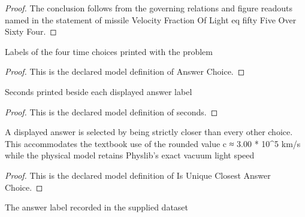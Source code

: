 \begin{proof}
  The conclusion follows from the governing relations and figure readouts named in the statement of missile Velocity Fraction Of Light eq fifty Five Over Sixty Four.
\end{proof}
\begin{definition}
  \label{def:physics:phyx-mini-0512:phyxminiproblems-problemphyxmini0512-answerchoice}
  Labels of the four time choices printed with the problem
\end{definition}
\begin{proof}
  This is the declared model definition of Answer Choice.
\end{proof}
\begin{definition}[seconds]
  \label{def:physics:phyx-mini-0512:phyxminiproblems-problemphyxmini0512-answerchoice-seconds}
  Seconds printed beside each displayed answer label
\end{definition}
\begin{proof}
  This is the declared model definition of seconds.
\end{proof}
\begin{definition}
  \label{def:physics:phyx-mini-0512:phyxminiproblems-problemphyxmini0512-isuniqueclosestanswerchoice}
  A displayed answer is selected by being strictly closer than every other choice. This accommodates the textbook use of the rounded value c ≈ 3.00 * 10\textasciicircum{}5 km/s while the physical model retains Physlib's exact vacuum light speed
\end{definition}
\begin{proof}
  This is the declared model definition of Is Unique Closest Answer Choice.
\end{proof}
\begin{definition}
  \label{def:physics:phyx-mini-0512:phyxminiproblems-problemphyxmini0512-recordedanswerchoice}
  The answer label recorded in the supplied dataset
\end{definition}
